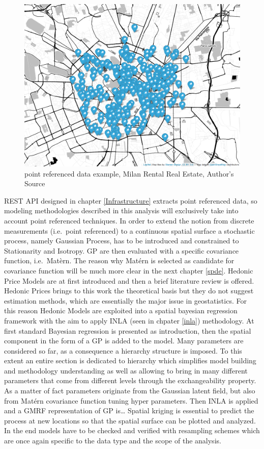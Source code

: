 \documentclass[
  12pt,
  a4paper,
  oneside]{book}
\theoremstyle{definition}
\theoremstyle{definition}
\theoremstyle{definition}
\theoremstyle{remark}
\begin{document}
\begin{figure}
\centering
\includegraphics{images/map.png}
\caption{point referenced data example, Milan Rental Real Estate, Author's Source}
\end{figure}

REST API designed in chapter \ref{Infrastructure} extracts point referenced data, so modeling methodologies described in this analysis will exclusively take into account point referenced techniques.
In order to extend the notion from discrete measurements (i.e.~point referenced) to a continuous spatial surface a stochastic process, namely Gaussian Process, has to be introduced and constrained to Stationarity and Isotropy. GP are then evaluated with a specific covariance function, i.e.~Matèrn. The reason why Matérn is selected as candidate for covariance function will be much more clear in the next chapter \ref{spde}.
Hedonic Price Models are at first introduced and then a brief literature review is offered. Hedonic Prices brings to this work the theoretical basis but they do not suggest estimation methods, which are essentially the major issue in geostatistics. For this reason Hedonic Models are exploited into a spatial bayesian regression framework with the aim to apply INLA (seen in chpater \ref{inla}) methodology.
At first standard Bayesian regression is presented as introduction, then the spatial component in the form of a GP is added to the model. Many parameters are considered so far, as a consequence a hierarchy structure is imposed. To this extent an entire section is dedicated to hierarchy which simplifies model building and methodology understanding as well as allowing to bring in many different parameters that come from different levels through the exchangeability property.
As a matter of fact parameters originate from the Gaussian latent field, but also from Matérn covariance function tuning hyper parameters.
Then INLA is applied and a GMRF representation of GP is\ldots{}
Spatial kriging is essential to predict the process at new locations so that the spatial surface can be plotted and analyzed.
In the end models have to be checked and verified with resampling schemes which are once again specific to the data type and the scope of the analysis.
\end{document}
